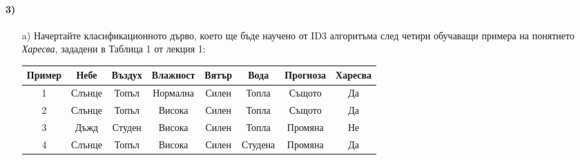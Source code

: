 \documentclass{article}
\begin{document}
\paragraph{3)}
\begin{enumerate}
\item [a)]
Начертайте класификационното дърво, което ще бъде научено от ID3
алгоритъма след четири обучаващи примера на понятието \textit{Харесва}, зададени
в Таблица 1 от лекция 1:
\begin{center}
  \begin{tabular}{ | c | c | c | c | c | c | c | c |}
    \hline
    Пример & Небе & Въздух & Влажност & Вятър & Вода & Прогноза & Харесва \\ \hline
    1 & Слънце & Топъл & Нормална & Силен & Топла & Същото & Да \\ \hline
    2 & Слънце & Топъл & Висока & Силен & Топла & Същото & Да \\ \hline
    3 & Дъжд & Студен & Висока & Силен & Топла & Промяна & Не \\ \hline
    4 & Слънце & Топъл & Висока & Силен & Студена & Промяна & Да \\
    \hline
  \end{tabular}
\end{center}

\end{enumerate}
\end{document}
